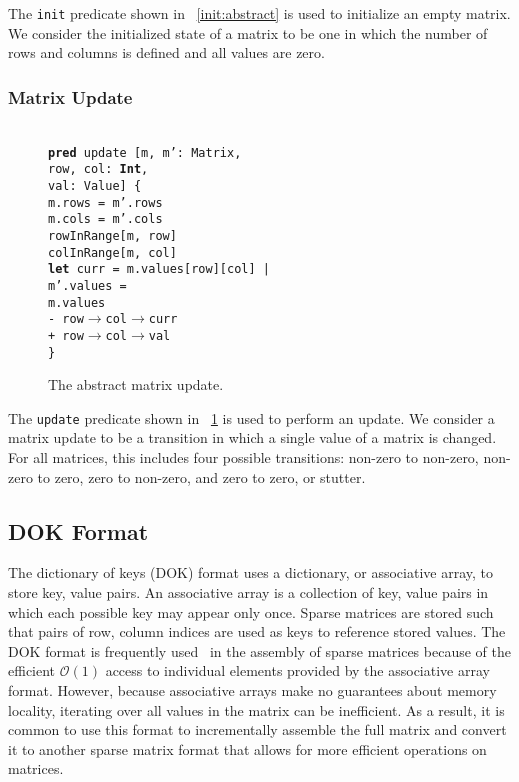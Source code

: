 \documentclass[11pt,conference]{IEEEtran}
\newenvironment{myquote}{\list{}{\leftmargin=12pt\rightmargin=0pt}\item[]}{\endlist}
\def\TA{\makebox[12pt]{}}
\def\TB{\makebox[24pt]{}}
\def\TC{\makebox[36pt]{}}
\def\TD{\makebox[48pt]{}}
\def\Bpred{\textbf{pred} }
\def\Blet{\textbf{let} }
\def\Bint{\textbf{Int}}
\begin{document}
The \texttt{init} predicate shown in \figurename~\ref{init:abstract} is used to initialize an empty matrix.  We consider the initialized state of a matrix to be one in which the number of rows and columns is defined and all values are zero.

\subsubsection{Matrix Update}

\begin{figure}
\centering
\begin{myquote}\small{\texttt{\\
\Bpred update [m, m': Matrix,\\
\TD row, col: \Bint,\\
\TD val: Value] \{\\
\TA m.rows = m'.rows\\
\TA m.cols = m'.cols\\
\TA rowInRange[m, row]\\
\TA colInRange[m, col]\\
\TA \Blet curr = m.values[row][col] |\\
\TB m'.values =\\
\TC m.values\\
\TC - row$\rightarrow$col$\rightarrow$curr\\
\TC + row$\rightarrow$col$\rightarrow$val\\
\}
}}
\end{myquote}
\caption{The abstract matrix update.}
\label{update:abstract}
\end{figure}

The \texttt{update} predicate shown in \figurename~\ref{update:abstract} is used to perform an update.  We consider a matrix update to be a transition in which a single value of a matrix is changed.  For all matrices, this includes four possible transitions: non-zero to non-zero, non-zero to zero, zero to non-zero, and zero to zero, or stutter.

\subsection{DOK Format}

The dictionary of keys (DOK) format uses a dictionary, or associative array, to store key, value pairs.  An associative array is a collection of key, value pairs in which each possible key may appear only once.  Sparse matrices are stored such that pairs of row, column indices are used as keys to reference stored values.  The DOK format is frequently used~\cite{scipy, eigenweb2010} in the assembly of sparse matrices because of the efficient \(\mathcal{O}(1)\) access to individual elements provided by the associative array format.  However, because associative arrays make no guarantees about memory locality, iterating over all values in the matrix can be inefficient.  As a result, it is common to use this format to incrementally assemble the full matrix and convert it to another sparse matrix format that allows for more efficient operations on matrices.
\end{document}
